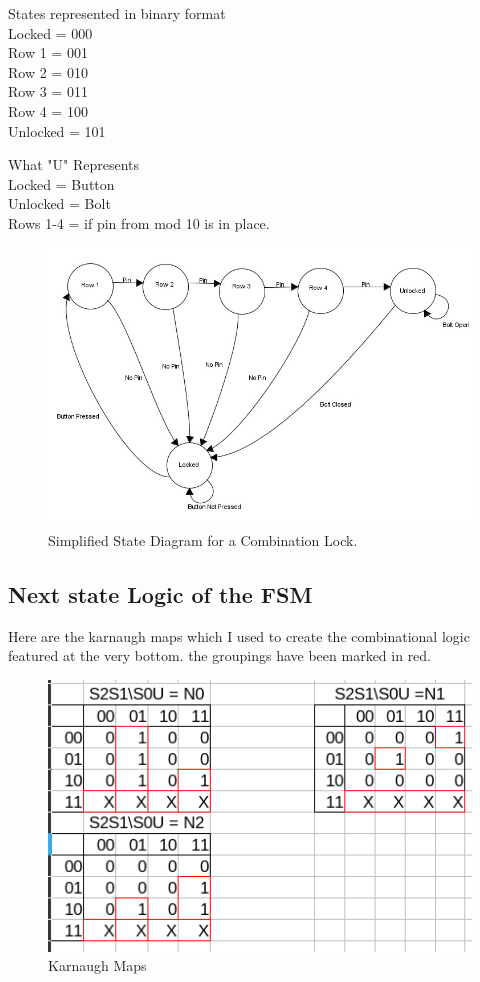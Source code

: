\documentclass{article}
\begin{document}
\begin{minipage}[t]{0.48\linewidth}
	\vspace{0pt}
	\centering
	States represented in binary format \\
	Locked = 000\\
	Row 1 = 001\\
	Row 2 = 010\\
	Row 3 = 011 \\
	Row 4 = 100\\
	Unlocked = 101
	\par\null\par
	What "U" Represents \\
	Locked = Button\\
	Unlocked = Bolt\\
	Rows 1-4 = if pin from mod 10 is in place.
\end{minipage}
\begin{figure}[h!]
	\centering
	\includegraphics[scale = 0.6]{comb-lock-fsm.jpg}
	\caption{Simplified State Diagram for a Combination Lock.}
	\label{fig:comb-lock}
\end{figure}
\newpage
\subsection{Next state Logic of the FSM}
Here are the karnaugh maps which I used to create the combinational logic featured at the very bottom. the groupings have been marked in red.
\begin{figure}[h!]
	\centering
	\includegraphics{karnaughmapswithgroupings.png}
	\caption{Karnaugh Maps}
	\label{}
\end{figure}
\end{document}

